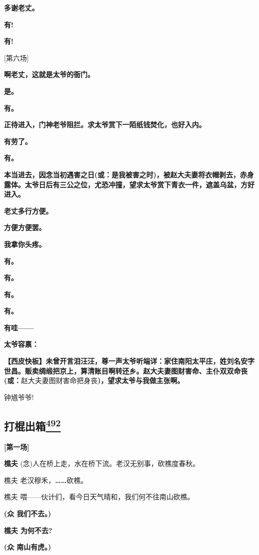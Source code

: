 \textbf{多谢老丈。}

\textbf{有!}

\textbf{有!}

{[}第六场{]}

\textbf{啊老丈，这就是太爷的衙门。}

\textbf{是。}

\textbf{有。}

\textbf{正待进入，门神老爷阻拦。求太爷赏下一陌纸钱焚化，也好入内。}

\textbf{有劳了。}

\textbf{有。}

\textbf{本当进去，因念当初遇害之日(或：是我被害之时)，被赵大夫妻将衣帽剥去，赤身露体。太爷日后有三公之位，尤恐冲撞，望求太爷赏下青衣一件，遮盖乌盆，方好进入。}

\textbf{老丈多行方便。}

\textbf{方便方便罢。}

\textbf{我拿你头疼。}

\textbf{有。}

\textbf{有。}

\textbf{有。}

\textbf{有。}

\textbf{有哇------}

\textbf{太爷容禀：}

\textbf{【西皮快板】未曾开言泪汪汪，尊一声太爷听端详：家住南阳太平庄，姓刘名安字世昌。贩卖绸缎把京上，算清账目啊转还乡。赵大夫妻图财害命、主仆双双命丧(或：}赵大夫妻图财害命把身丧\textbf{)，望求太爷与我做主张啊。}

钟馗爷爷!

\newpage
\hypertarget{ux6253ux68cdux51faux7bb1}{%
\subsection{\texorpdfstring{打棍出箱\protect\hyperlink{fn492}{\textsuperscript{492}}}{打棍出箱492}}\label{ux6253ux68cdux51faux7bb1}}

\textbf{{[}第一场{]}}

\textbf{樵夫} (念)人在桥上走，水在桥下流。老汉无别事，砍樵度春秋。

樵夫 老汉穆禾，\textbf{\ldots{}\ldots{}}砍樵。

樵夫 喂------伙计们，看今日天气晴和，我们何不往南山砍樵。

\textbf{(众 我们不去。)}

\textbf{樵夫 为何不去?}

\textbf{(众 南山有虎。)}

